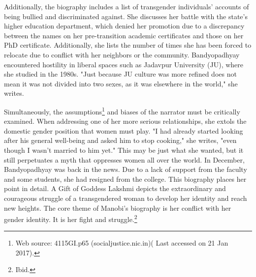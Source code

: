 \begin{multicols}{2}
\noi
Additionally, the biography includes a list of transgender individuals' accounts of being bullied
and discriminated against. She discusses her battle with the state's higher education department,
which denied her promotion due to a discrepancy between the names on her pre-transition
academic certificates and those on her PhD certificate. Additionally, she lists the number of
times she has been forced to relocate due to conflict with her neighbors or the community.
Bandyopadhyay encountered hostility in liberal spaces such as Jadavpur University (JU), where
she studied in the 1980s. "Just because JU culture was more refined does not mean it was not
divided into two sexes, as it was elsewhere in the world," she writes.


\noi
Simultaneously, the assumptions\footnote{Web source: 4115GI.p65 (socialjustice.nic.in)( Last accessed on 21 Jan 2017).} and biases of the narrator must be critically examined. When addressing one of her more serious relationships, she extols the domestic gender position that women must play. "I had already started looking after his general well-being and asked him to stop cooking," she writes, "even though I wasn't married to him yet." This may be just what she wanted, but it still perpetuates a myth that oppresses women all over the world. In December, Bandyopadhyay was back in the news. Due to a lack of support from the faculty and some students, she had resigned from the college. This biography places her point in detail. A Gift of Goddess Lakshmi depicts the extraordinary and courageous struggle of a
transgendered woman to develop her identity and reach new heights. The core theme of
Manobi's biography is her conflict with her gender identity. It is her fight and struggle.\footnote{Ibid.}

\end{multicols}
	
